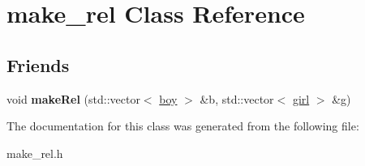 \hypertarget{classmake__rel}{}\section{make\+\_\+rel Class Reference}
\label{classmake__rel}
\subsection*{Friends}
\begin{DoxyCompactItemize}
\item 
\mbox{\label{classmake__rel_a2b7cdefda7888df96abec3086bd10128}} 
void {\bfseries make\+Rel} (std\+::vector$<$ \hyperlink{classboy}{boy} $>$ \&b, std\+::vector$<$ \hyperlink{classgirl}{girl} $>$ \&g)
\end{DoxyCompactItemize}


The documentation for this class was generated from the following file\+:\begin{DoxyCompactItemize}
\item 
make\+\_\+rel.\+h\end{DoxyCompactItemize}
